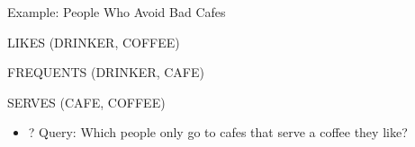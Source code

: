 \documentclass[aspectratio=169]{beamer}
\newenvironment{noindentitemize}
{ \begin{itemize}
 \setlength{\itemsep}{1.5ex}
  \setlength{\parsep}{0pt}   
  \setlength{\parskip}{0pt}
 \addtolength{\leftskip}{-2em}
 }
{ \end{itemize} }
\begin{document}
%
%
%
%
%
%
%
%
%
%
%
%
%
%
%
%
%
%
%
%
\begin{frame}{Example: People Who Avoid Bad Cafes} %

LIKES (DRINKER, COFFEE)

FREQUENTS (DRINKER, CAFE)

SERVES (CAFE, COFFEE)

\begin{noindentitemize}
\item[?] Query: Which people only go to cafes that serve a coffee they like?
\end{noindentitemize}
\end{frame}
\end{document}
